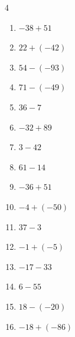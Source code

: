 \begin{multicols}{4}
\begin{enumerate}
        \phantom{$=117$}

\columnbreak %

  \item $-38+51$

        \phantom{$=13$}

  \item $22+(-42)$

        \phantom{$=-20$}

  \item $54-(-93)$

        \phantom{$=147$}

  \item $71-(-49)$

        \phantom{$=120$}

  \item $36-7$

        \phantom{$=29$}

  \item $-32+89$

        \phantom{$=57$}

  \item $3-42$

        \phantom{$=-39$}

  \item $61-14$

        \phantom{$=47$}

  \item $-36+51$

        \phantom{$=15$}

  \item $-4+(-50)$

        \phantom{$=-54$}

  \item $37-3$

        \phantom{$=34$}

  \item $-1+(-5)$

        \phantom{$=-6$}

  \item $-17-33$

        \phantom{$=-50$}

  \item $6-55$

        \phantom{$=-49$}

  \item $18-(-20)$

        \phantom{$=38$}

  \item $-18+(-86)$


\end{enumerate}
\end{multicols}
